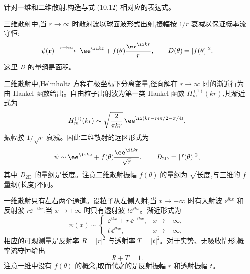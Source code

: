 \begin{question}
针对一维和二维散射,构造与式 (10.12) 相对应的表达式。

\par\smallskip
{}

\end{question}
\begin{solution}
三维散射中,当 $r\to\infty$ 时散射波以球面波形式出射,振幅按 $1/r$ 衰减以保证概率流守恒:
\[
\psi(\mathbf r)\;\xrightarrow{r\to\infty}\; \ee^{\ii kz}+f(\theta){\ee^{\ii kr}\over r},
\qquad
D(\theta)=|f(\theta)|^2.
\]
这里 $D$ 的量纲是面积。

二维散射中,Helmholtz 方程在极坐标下分离变量,径向解在 $r\to\infty$ 时的渐近行为由 Hankel 函数给出。自由粒子出射波为第一类 Hankel 函数 $H_m^{(1)}(kr)$,其渐近式为
\[
H_m^{(1)}(kr)\sim\sqrt{2\over\pi kr}\,\ee^{\ii(kr-m\pi/2-\pi/4)},
\]
振幅按 $1/\sqrt{r}$ 衰减。因此二维散射的远区形式为
\[
\psi\sim \ee^{\ii kx}+f(\theta){\ee^{\ii kr}\over\sqrt r},
\qquad
D_{\text{2D}}=|f(\theta)|^2,
\]
其中 $D_{\text{2D}}$ 的量纲是长度。注意二维散射振幅 $f(\theta)$ 的量纲为 $\sqrt{\text{长度}}$,与三维的 $f$ 量纲(长度)不同。

一维散射只有左右两个通道。设粒子从左侧入射,当 $x\to-\infty$ 时有入射波 $\ee^{\ii kx}$ 和反射波 $r\ee^{-\ii kx}$;当 $x\to+\infty$ 时只有透射波 $t\ee^{\ii kx}$。渐近形式为
\[
\psi(x)\sim\begin{cases}
\ee^{\ii kx}+r\,\ee^{-\ii kx}, & x\to-\infty,\\[4pt]
t\,\ee^{\ii kx}, & x\to+\infty,
\end{cases}
\]
相应的可观测量是反射率 $R=|r|^2$ 与透射率 $T=|t|^2$。对于实势、无吸收情形,概率流守恒给出
\[
\boxed{R+T=1.}
\]
注意一维中没有 $f(\theta)$ 的概念,取而代之的是反射振幅 $r$ 和透射振幅 $t$。
\end{solution}

